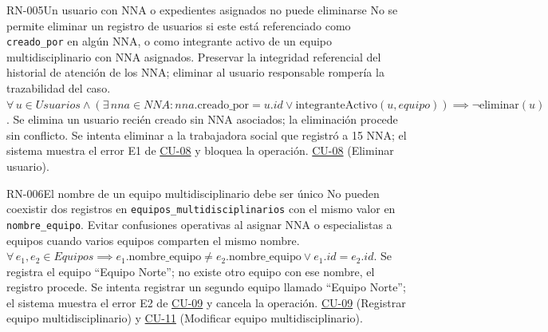\begin{BussinesRule}[%
	\brClassification{\btEnabler}{\bcIntegrity}{\blStrict}%
	]{RN-005}{Un usuario con NNA o expedientes asignados no puede eliminarse}
	\BRitem[Descripción:] No se permite eliminar un registro de usuarios si este está referenciado como \texttt{creado\_por} en algún NNA, o como integrante activo de un equipo multidisciplinario con NNA asignados.
	\BRitem[Motivación:] Preservar la integridad referencial del historial de atención de los NNA; eliminar al usuario responsable rompería la trazabilidad del caso.
	\BRitem[Sentencia:] $\forall \, u \in Usuarios \land (\exists \, nna \in NNA : nna.\text{creado\_por} = u.id \lor \text{integranteActivo}(u, equipo)) \implies \neg \text{eliminar}(u)$.
	 Se elimina un usuario recién creado sin NNA asociados; la eliminación procede sin conflicto.
	 Se intenta eliminar a la trabajadora social que registró a 15 NNA; el sistema muestra el error E1 de \hyperlink{CU-08}{CU-08} y bloquea la operación.
	 \hyperlink{CU-08}{CU-08} (Eliminar usuario).
\end{BussinesRule}



\begin{BussinesRule}[%
	\brClassification{\btEnabler}{\bcIntegrity}{\blStrict}%
	]{RN-006}{El nombre de un equipo multidisciplinario debe ser único}
	\BRitem[Descripción:] No pueden coexistir dos registros en \texttt{equipos\_multidisciplinarios} con el mismo valor en \texttt{nombre\_equipo}.
	\BRitem[Motivación:] Evitar confusiones operativas al asignar NNA o especialistas a equipos cuando varios equipos comparten el mismo nombre.
	\BRitem[Sentencia:] $\forall \, e_1, e_2 \in Equipos \implies e_1.\text{nombre\_equipo} \neq e_2.\text{nombre\_equipo} \lor e_1.id = e_2.id$.
	 Se registra el equipo ``Equipo Norte''; no existe otro equipo con ese nombre, el registro procede.
	 Se intenta registrar un segundo equipo llamado ``Equipo Norte''; el sistema muestra el error E2 de \hyperlink{CU-09}{CU-09} y cancela la operación.
	 \hyperlink{CU-09}{CU-09} (Registrar equipo multidisciplinario) y \hyperlink{CU-11}{CU-11} (Modificar equipo multidisciplinario).
\end{BussinesRule}

